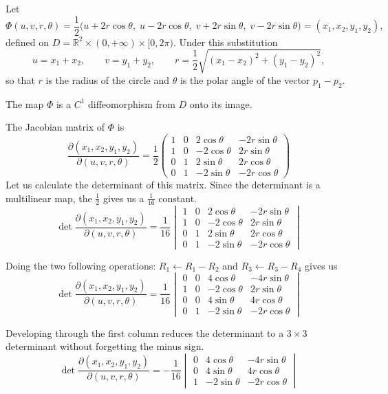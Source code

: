\documentclass[11pt,a4paper]{article}
\theoremstyle{plain}
\theoremstyle{remark}
\begin{document}
Let
\[
    \Phi(u, v, r, \theta) =
    \frac{1}{2}
    \bigl(
        u + 2r\cos\theta,\;
        u - 2r\cos\theta,\;
        v + 2r\sin\theta,\;
        v - 2r\sin\theta
    \bigr)
    = (x_1, x_2, y_1, y_2),
\]
defined on $D = \mathbb{R}^2 \times (0, +\infty) \times [0, 2\pi)$. Under this substitution
\[
    u = x_1 + x_2, \qquad
    v = y_1 + y_2, \qquad
    r = \frac{1}{2}\sqrt{(x_1-x_2)^2 + (y_1-y_2)^2},
\]
so that $r$ is the radius of the circle and $\theta$ is the polar angle of the vector $p_1 - p_2$.

The map $\Phi$ is a $C^1$ diffeomorphism from $D$ onto its image.

The Jacobian matrix of $\Phi$ is
\[
    \frac{\partial(x_1, x_2, y_1, y_2)}{\partial(u, v, r, \theta)}
    =
    \frac{1}{2}
    \begin{pmatrix}
        1 & 0 & 2\cos\theta  & -2r\sin\theta \\
        1 & 0 & -2\cos\theta & 2r\sin\theta  \\
        0 & 1 & 2\sin\theta  & 2r\cos\theta  \\
        0 & 1 & -2\sin\theta & -2r\cos\theta
    \end{pmatrix}
\]
Let us calculate the determinant of this matrix. Since the determinant is a multilinear map, the $\frac{1}{2}$ gives us a $\frac{1}{16}$ constant.
\[
    \det \frac{\partial(x_1, x_2, y_1, y_2)}{\partial(u, v, r, \theta)}
    = \frac{1}{16}
    \begin{vmatrix}
        1 & 0 & 2\cos\theta  & -2r\sin\theta \\
        1 & 0 & -2\cos\theta & 2r\sin\theta  \\
        0 & 1 & 2\sin\theta  & 2r\cos\theta  \\
        0 & 1 & -2\sin\theta & -2r\cos\theta
    \end{vmatrix}
\]

Doing the two following operations: $R_1 \leftarrow R_1 - R_2$ and $R_3 \leftarrow R_3 - R_4$ gives us
\[
    \det \frac{\partial(x_1, x_2, y_1, y_2)}{\partial(u, v, r, \theta)}
    = \frac{1}{16}
    \begin{vmatrix}
        0 & 0 & 4\cos\theta  & -4r\sin\theta \\
        1 & 0 & -2\cos\theta & 2r\sin\theta  \\
        0 & 0 & 4\sin\theta  & 4r\cos\theta  \\
        0 & 1 & -2\sin\theta & -2r\cos\theta
    \end{vmatrix}
\]

Developing through the first column reduces the determinant to a $3\times 3$ determinant without forgetting the minus sign.
\[
    \det \frac{\partial(x_1, x_2, y_1, y_2)}{\partial(u, v, r, \theta)}
    = -\frac{1}{16}
    \begin{vmatrix}
        0 & 4\cos\theta  & -4r\sin\theta \\
        0 & 4\sin\theta  & 4r\cos\theta  \\
        1 & -2\sin\theta & -2r\cos\theta
    \end{vmatrix}
\]
\end{document}
